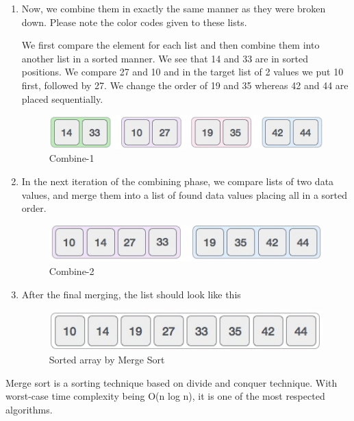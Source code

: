 \begin{enumerate}
\item Now, we combine them in exactly the same manner as they were broken down. Please note the color codes given to these lists.

We first compare the element for each list and then combine them into another list in a sorted manner. We see that 14 and 33 are in sorted positions. We compare 27 and 10 and in the target list of 2 values we put 10 first, followed by 27. We change the order of 19 and 35 whereas 42 and 44 are placed sequentially.
\begin{figure}[htp]%
    \centre%
    \includegraphics[width=1\textwidth]{images/ch4/merge_sort_combine_1.jpg}%
    \caption[Merge Sort combine-1]{Combine-1}\label{fig:Combine-1}%
  \end{figure}
  
\item In the next iteration of the combining phase, we compare lists of two data values, and merge them into a list of found data values placing all in a sorted order.\newline

\begin{figure}[htp]%
    \centre%
    \includegraphics[width=1\textwidth]{images/ch4/merge_sort_combine_2.jpg}%
    \caption[Merge Sort combine-2]{Combine-2}\label{fig:Combine-2}%
  \end{figure}
  \newline
\item After the final merging, the list should look like this
\newline
    \begin{figure}[htp]%
    \centre%
    \includegraphics[width=1\textwidth]{images/ch4/merge_sort.jpg}%
    \caption[Sorted array after merge sort]{Sorted array by Merge Sort}\label{fig:Sorted array}%
    \end{figure}
    \end{enumerate}
  Merge sort is a sorting technique based on divide and conquer technique. With worst-case time complexity being Ο(n log n), it is one of the most respected algorithms.\cite{am007}

